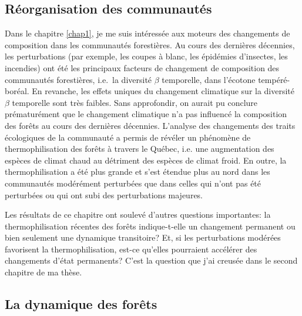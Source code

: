 \hypertarget{ruxe9organisation-des-communautuxe9s}{%
\subsection{Réorganisation des
communautés}\label{ruxe9organisation-des-communautuxe9s}}

Dans le chapitre \ref{chap1}, je me suis intéressée aux moteurs des
changements de composition dans les communautés forestières. Au cours
des dernières décennies, les perturbations (par exemple, les coupes à
blanc, les épidémies d'insectes, les incendies) ont été les principaux
facteurs de changement de composition des communautés forestières,
i.e.~la diversité \(\beta\) temporelle, dans l'écotone tempéré-boréal.
En revanche, les effets uniques du changement climatique sur la
diversité \(\beta\) temporelle sont très faibles. Sans approfondir, on
aurait pu conclure prématurément que le changement climatique n'a pas
influencé la composition des forêts au cours des dernières décennies.
L'analyse des changements des traits écologiques de la communauté a
permis de révéler un phénomène de thermophilisation des forêts à travers
le Québec, i.e. une augmentation des espèces de climat chaud au
détriment des espèces de climat froid. En outre, la thermophilisation a
été plus grande et s'est étendue plus au nord dans les communautés
modérément perturbées que dans celles qui n'ont pas été perturbées ou
qui ont subi des perturbations majeures.

Les résultats de ce chapitre ont soulevé d'autres questions importantes:
la thermophilisation récentes des forêts indique-t-elle un changement
permanent ou bien seulement une dynamique transitoire? Et, si les
perturbations modérées favorisent la thermophilisation, est-ce qu'elles
pourraient accélérer des changements d'état permanents? C'est la
question que j'ai creusée dans le second chapitre de ma thèse.

\hypertarget{la-dynamique-des-foruxeats}{%
\subsection{La dynamique des forêts}\label{la-dynamique-des-foruxeats}}

